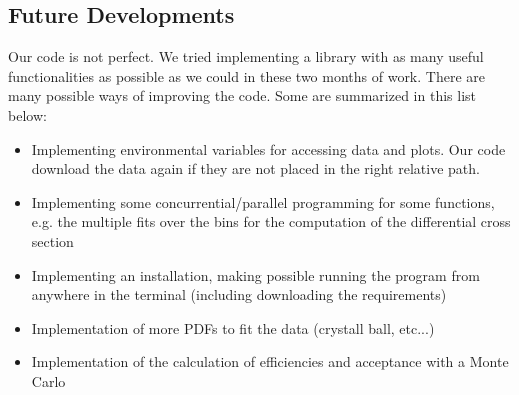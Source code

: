 \documentclass[a4paper,11pt]{article}
\begin{document}
\subsection{Future Developments}
Our code is not perfect. We tried implementing a library with as many useful functionalities as possible as we could in these two months of work. There are many possible ways of improving the code. Some are summarized in this list below:
\begin{itemize}
    \item Implementing environmental variables for accessing data and plots. Our code download the data again if they are not placed in the right relative path.
    \item Implementing some concurrential/parallel programming for some functions, e.g. the multiple fits over the bins for the computation of the differential cross section
    \item Implementing an installation, making possible running the program from anywhere in the terminal (including downloading the requirements)
    \item Implementation of more PDFs to fit the data (crystall ball, etc...)
    \item Implementation of the calculation of efficiencies and acceptance with a Monte Carlo
\end{itemize}

\printbibliography
\end{document}
